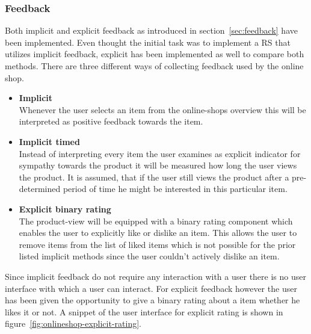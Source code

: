 \subsubsection{Feedback}
\label{sec:onlineshop-feedback}
Both implicit and explicit feedback as introduced in section~\ref{sec:feedback} have been implemented.
Even thought the initial task was to implement a RS that utilizes implicit feedback, explicit has been implemented as well to compare both methods.
There are three different ways of collecting feedback used by the online shop.
\begin{itemize}
    \item \textbf{Implicit}\hfill\\
        Whenever the user selects an item from the online-shops overview this will be interpreted as positive feedback towards the item.
    \item \textbf{Implicit timed}\hfill\\
        Instead of interpreting every item the user examines as explicit indicator for sympathy towards the product it will be measured how long the user views the product.
        It is assumed, that if the user still views the product after a pre-determined period of time he might be interested in this particular item.
    \item \textbf{Explicit binary rating}\\
        The product-view will be equipped  with a binary rating component which enables the user to explicitly like or dislike an item.
        This allows the user to remove items from the list of liked items which is not possible for the prior listed implicit methods since the user couldn't actively dislike an item.
\end{itemize}

Since implicit feedback do not require any interaction with a user there is no user interface with which a user can interact.
For explicit feedback however the user has been given the opportunity to give a binary rating about a item whether he likes it or not.
A snippet of the user interface for explicit rating is shown in figure~\ref{fig:onlineshop-explicit-rating}.

